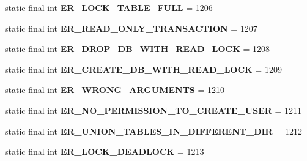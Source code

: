 \begin{DoxyCompactItemize}
static final int {\bfseries E\+R\+\_\+\+L\+O\+C\+K\+\_\+\+T\+A\+B\+L\+E\+\_\+\+F\+U\+LL} = 1206
\item 
\mbox{\label{classcom_1_1mysql_1_1jdbc_1_1_mysql_error_numbers_a2d865a3f29e369becb90d1b3923d2d26}} 
static final int {\bfseries E\+R\+\_\+\+R\+E\+A\+D\+\_\+\+O\+N\+L\+Y\+\_\+\+T\+R\+A\+N\+S\+A\+C\+T\+I\+ON} = 1207
\item 
\mbox{\label{classcom_1_1mysql_1_1jdbc_1_1_mysql_error_numbers_a72fbb175e8c9dc50f78cac293112a9a9}} 
static final int {\bfseries E\+R\+\_\+\+D\+R\+O\+P\+\_\+\+D\+B\+\_\+\+W\+I\+T\+H\+\_\+\+R\+E\+A\+D\+\_\+\+L\+O\+CK} = 1208
\item 
\mbox{\label{classcom_1_1mysql_1_1jdbc_1_1_mysql_error_numbers_ac567a2d5ca8dec560368efe2addf81b3}} 
static final int {\bfseries E\+R\+\_\+\+C\+R\+E\+A\+T\+E\+\_\+\+D\+B\+\_\+\+W\+I\+T\+H\+\_\+\+R\+E\+A\+D\+\_\+\+L\+O\+CK} = 1209
\item 
\mbox{\label{classcom_1_1mysql_1_1jdbc_1_1_mysql_error_numbers_aa433b53090ead277f24f858eadf26fa1}} 
static final int {\bfseries E\+R\+\_\+\+W\+R\+O\+N\+G\+\_\+\+A\+R\+G\+U\+M\+E\+N\+TS} = 1210
\item 
\mbox{\label{classcom_1_1mysql_1_1jdbc_1_1_mysql_error_numbers_a4fdffe9705c6aa0bfee171e10406db10}} 
static final int {\bfseries E\+R\+\_\+\+N\+O\+\_\+\+P\+E\+R\+M\+I\+S\+S\+I\+O\+N\+\_\+\+T\+O\+\_\+\+C\+R\+E\+A\+T\+E\+\_\+\+U\+S\+ER} = 1211
\item 
\mbox{\label{classcom_1_1mysql_1_1jdbc_1_1_mysql_error_numbers_aee72c7dcf4f816ee87c70d57a93a38a9}} 
static final int {\bfseries E\+R\+\_\+\+U\+N\+I\+O\+N\+\_\+\+T\+A\+B\+L\+E\+S\+\_\+\+I\+N\+\_\+\+D\+I\+F\+F\+E\+R\+E\+N\+T\+\_\+\+D\+IR} = 1212
\item 
\mbox{\label{classcom_1_1mysql_1_1jdbc_1_1_mysql_error_numbers_a3c7c7910e52e2972e2aac95851a7a782}} 
static final int {\bfseries E\+R\+\_\+\+L\+O\+C\+K\+\_\+\+D\+E\+A\+D\+L\+O\+CK} = 1213

\end{DoxyCompactItemize}
